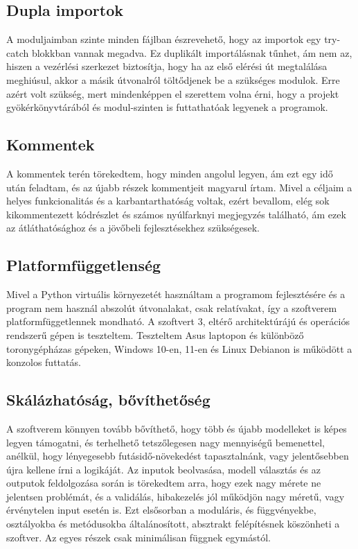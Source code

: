 \documentclass[12pt]{report}
\begin{document}
    \subsection{Dupla importok}
    A moduljaimban szinte minden fájlban észrevehető, hogy az importok egy try-catch blokkban vannak megadva.
    Ez duplikált importálásnak tűnhet, ám nem az, hiszen a vezérlési szerkezet biztosítja, hogy ha az első elérési út megtalálása meghiúsul, akkor a másik útvonalról töltődjenek be a szükséges modulok.
    Erre azért volt szükség, mert mindenképpen el szerettem volna érni, hogy a projekt gyökérkönyvtárából és modul-szinten is futtathatóak legyenek a programok.

    \subsection{Kommentek}
    A kommentek terén törekedtem, hogy minden angolul legyen, ám ezt egy idő után feladtam, és az újabb részek kommentjeit magyarul írtam.
    Mivel a céljaim a helyes funkcionalitás és a karbantarthatóság voltak, ezért bevallom, elég sok kikommentezett kódrészlet és számos nyúlfarknyi megjegyzés található, ám ezek az átláthatósághoz és a jövőbeli fejlesztésekhez szükségesek.

    \subsection{Platformfüggetlenség}
    Mivel a Python virtuális környezetét használtam a programom fejlesztésére és a program nem használ abszolút útvonalakat, csak relatívakat, így a szoftverem platformfüggetlennek mondható.
    A szoftvert 3, eltérő architektúrájú és operációs rendszerű gépen is teszteltem.
    Teszteltem Asus laptopon és különböző toronygépházas gépeken, Windows 10-en, 11-en és Linux Debianon is működött a konzolos futtatás.

    \subsection{Skálázhatóság, bővíthetőség}
    A szoftverem könnyen tovább bővíthető, hogy több és újabb modelleket is képes legyen támogatni, és terhelhető tetszőlegesen nagy mennyiségű bemenettel, anélkül, hogy lényegesebb futásidő-növekedést tapasztalnánk, vagy jelentősebben újra kellene írni a logikáját.
    Az inputok beolvasása, modell választás és az outputok feldolgozása során is törekedtem arra, hogy ezek nagy mérete ne jelentsen problémát, és a validálás, hibakezelés jól működjön nagy méretű, vagy érvénytelen input esetén is.
    Ezt elsősorban a moduláris, és függvényekbe, osztályokba és metódusokba általánosított, absztrakt felépítésnek köszönheti a szoftver.
    Az egyes részek csak minimálisan függnek egymástól.
\end{document}

